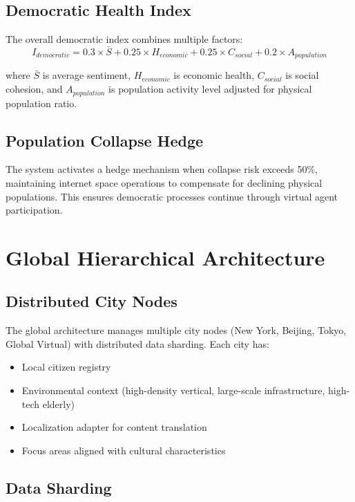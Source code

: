 \documentclass[12pt,a4paper]{article}
\begin{document}
\begin{itemize}
\subsection{Democratic Health Index}

The overall democratic index combines multiple factors:
\begin{equation}
I_{democratic} = 0.3 \times \bar{S} + 0.25 \times H_{economic} + 0.25 \times C_{social} + 0.2 \times A_{population}
\end{equation}

where $\bar{S}$ is average sentiment, $H_{economic}$ is economic health, $C_{social}$ is social cohesion, and $A_{population}$ is population activity level adjusted for physical population ratio.

\subsection{Population Collapse Hedge}

The system activates a hedge mechanism when collapse risk exceeds 50\%, maintaining internet space operations to compensate for declining physical populations. This ensures democratic processes continue through virtual agent participation.

\section{Global Hierarchical Architecture}

\subsection{Distributed City Nodes}

The global architecture manages multiple city nodes (New York, Beijing, Tokyo, Global Virtual) with distributed data sharding. Each city has:
\begin{itemize}
    \item Local citizen registry
    \item Environmental context (high-density vertical, large-scale infrastructure, high-tech elderly)
    \item Localization adapter for content translation
    \item Focus areas aligned with cultural characteristics
\end{itemize}

\subsection{Data Sharding}


\end{itemize}
\end{document}
